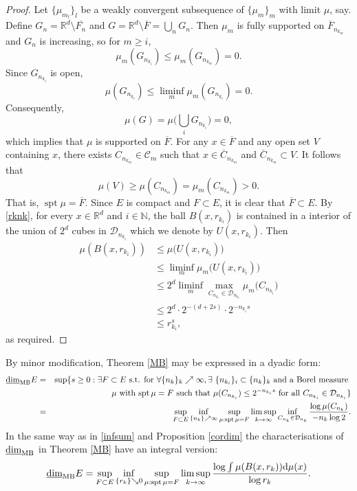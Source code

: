 \documentclass[12pt]{article}
\newcommand{\1}{{\bf 1}}
\newcommand{\D}{\mathcal{D}}
\DeclareMathOperator{\spt}{spt}
\newcommand\mlbd{\underline{\mbox{\rm dim}}_{\rm MB}} %
\newcommand{\R}{\mathbb{R}}
\begin{document}
\begin{proof}
	Let $\{\mu_{m_l}\}_l$ be a weakly convergent subsequence of $\{\mu_m\}_m$ with limit $\mu$, say. 
	Define $G_n=\R^d\setminus \overline{F_n}$ and $G=\R^d \setminus \overline{F}=\bigcup_n G_n$.
	Then $\mu_{m} $ is   fully  supported on $\overline{F}_{n_{k_m}}$ and $G_n$ is increasing, so 
	 for  $m\geq i$,  
	 	$$\mu_m(G_{n_{k_i}})\leq \mu_m(G_{n_{k_m}})=0.$$
	Since $G_{n_{k_i}}$ is open, 
	$$\mu(G_{n_{k_i}})\leq\liminf_m\mu_{m}(G_{n_{k_i}})=0.$$
	Consequently, $$\mu(G)=\mu\big(\bigcup_iG_{n_{k_i}}\big)=0,$$ which implies that $\mu$ is  supported on $\overline{F}$.
 For any $x\in \overline{F}$ and any open set $V$ containing $x$, there exists $C_{n_{k_m}}\in\mathcal{C}_m$ such that $x\in\overline{C}_{n_{k_m}}$ and $\overline{C}_{n_{k_m}}\subset V$. It follows that
		\begin{equation*}
			\mu(V)\geq\mu(C_{n_{k_m}})=\mu_m(C_{n_{k_m}})>0.
		\end{equation*}
		That is, $\spt\mu= \overline{F}$.
		Since $E$ is compact and $F\subset  E$, it is clear that $\overline{F}\subset  E$.
	By \eqref{rknk}, for every $x\in\R^d$ and $i\in\mathbb{N}$, the ball $B(x,r_{k_i})$ is contained in a interior of the union of $2^d$ cubes in $\D_{n_{k_i}}$ which we denote by $U(x,r_{k_i})$.
Then
\begin{align*}
	\mu(B(x,r_{k_i}))&\leq\mu\big(U(x,r_{k_i})\big)\\
	&\leq\liminf_{m}\mu_{ m}\big(U(x,r_{k_i})\big)\\
	&\leq 2^d \liminf_{m}\max_{C_{n_{k_i}}\in \D_{n_{k_i}}}\mu_{m}\big(C_{n_{k_i}}\big)\\
	&\leq 2^d\cdot 2^{-(d+2s)}\cdot 2^{-n_{k_i}s}\\
	&\leq   r_{k_i}^s,
\end{align*}
as required.
\end{proof}

By minor modification, Theorem \ref{MB} may be expressed in a dyadic form:
\begin{eqnarray}\label{mlbdim1}
	\mlbd E &= &\sup \{s  \geq 0: \exists F\subset E \text{{\rm \ s.t.  for $\forall \{n_k\}_k\nearrow \infty, \exists\ \{n_{k_i}\}_i\subset\{n_k\}_k$ and a  Borel measure   }}\notag\\ 
	&& \mu\   \text{{\rm  with  $\spt\mu=F$ such that $\mu(C_{n_{k_i}})\leq 2^{-n_{k_i}s}$  for all  $C_{n_{k_i}}\in \D_{n_{k_i}}$\}}}\\
	&=& \sup_{F\subset E}\inf_{\{n_k\}\nearrow\infty} \sup_{\mu:\spt\mu=F} \limsup_{k\to\infty} \inf_{C_{n_k}\in \D_{n_k}} \frac{\log  \mu(C_{n_k})}{ -{n_k}\log 2}. \notag
\end{eqnarray}
In the same way as in \eqref{infsum} and Proposition \ref {cordim} the characterisations of  $\mlbd$ in Theorem \ref{MB} have an integral version:
	\begin{equation}\label{MBL}
		\mlbd E = \sup_{F\subset E}\inf_{\{r_k\}\searrow0}\sup_{\mu:\spt\mu=F}\limsup_{k\to\infty}   \frac{\log  \int\mu(B(x,r_k))\mathrm{d}\mu(x)}{ \log r_k}.	
	\end{equation}
\end{document}
